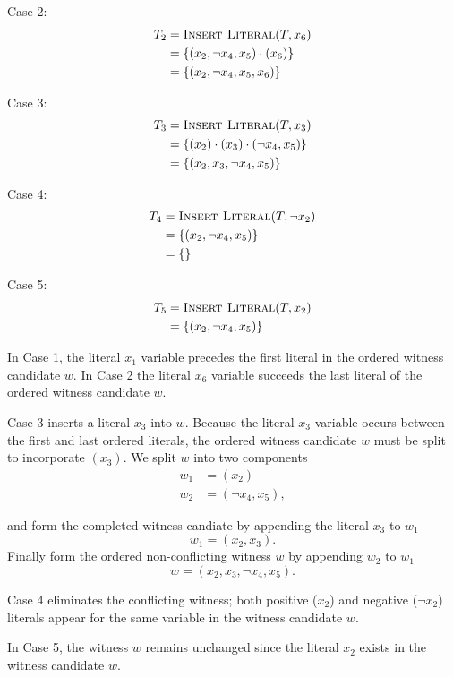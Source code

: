 Case 2:
\begin{align*}
T_2 &= \text{{\sc Insert Literal}}(T, x_6)\\
    &= \{ (x_2, \neg x_4, x_5) \cdot (x_6) \} \\
    &= \{ (x_2, \neg x_4, x_5, x_6) \}
\end{align*}	

Case 3:
\begin{align*}
T_3 &= \text{{\sc Insert Literal}}(T, x_3)\\
    &= \{ (x_2) \cdot (x_3) \cdot(\neg x_4, x_5) \} \\
	&= \{ (x_2, x_3, \neg x_4, x_5) \}
\end{align*}	

Case 4:
\begin{align*}
T_4 &= \text{{\sc Insert Literal}}(T, \neg x_2)\\
    &= \{ (x_2, \neg x_4, x_5) \} \\
	&= \{  \}
\end{align*}

Case 5:
\begin{align*}
T_5 &= \text{{\sc Insert Literal}}(T, x_2)\\
    &= \{ (x_2, \neg x_4, x_5) \} \\
\end{align*}

In Case 1, the literal $x_1$ variable precedes the first literal in the ordered witness candidate $w$.  In Case 2 the literal $x_6$ variable succeeds the last literal of the ordered witness candidate $w$.

Case 3 inserts a literal $x_3$ into $w$.  Because the literal $x_3$ variable occurs between the first and last ordered literals, the ordered witness candidate $w$ must be split to incorporate $(x_3)$.  We split $w$ into two components
\begin{align*}
w_1 &= (x_2) \\
w_2 &= (\neg x_4, x_5),
\end{align*}

\noindent and form the completed witness candiate by appending the literal $x_3$ to $w_1$
\[
w_1 = (x_2, x_3).
\]
\noindent Finally form the ordered non-conflicting witness $w$ by appending $w_2$ to $w_1$
\[
w = (x_2, x_3, \neg x_4, x_5).
\]

Case 4 eliminates the conflicting witness; both positive ($x_2$) and negative ($\neg x_2$) literals appear for the same variable in the witness candidate $w$.

In Case 5, the witness $w$ remains unchanged since the literal $x_2$ exists in the witness candidate $w$.

